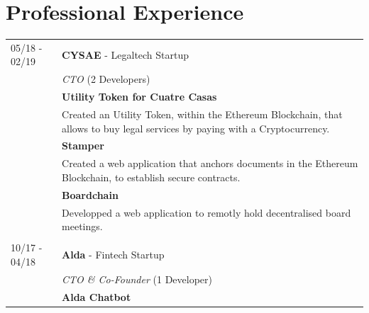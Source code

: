 \documentclass[11pt]{article}
\begin{document}
\begin{minipage}[t]{0.65\textwidth}


\section*{Professional Experience}
\begin{tabularx}{\textwidth}{lX}
  05/18 - 02/19 & \textbf{CYSAE} - Legaltech Startup\\
                & \textit{CTO} (2 Developers) \\
                & \small \textbf{Utility Token for Cuatre Casas} \\
                & \small Created an Utility Token, within the Ethereum Blockchain, that allows to buy legal services by
                  paying with a Cryptocurrency. \\
                & \small \textbf{Stamper} \\
                & \small Created a web application that anchors documents in the Ethereum
                  Blockchain, to establish secure contracts.\\
                & \small \textbf{Boardchain} \\
                & \small Developped a web application to remotly hold decentralised
                  board meetings. \\\\
  10/17 - 04/18 & \textbf{Alda} - Fintech Startup\\
                & \textit{CTO \& Co-Founder} (1 Developer) \\
                & \small \textbf{Alda Chatbot} \\

\end{tabularx}
\end{minipage}
\end{document}
